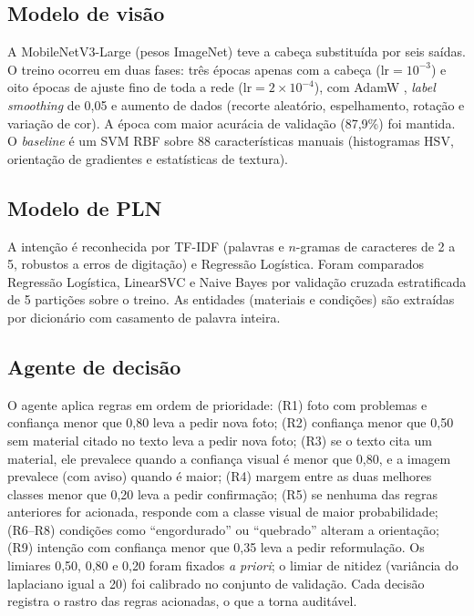 \documentclass[conference]{IEEEtran}
\begin{document}
\subsection{Modelo de vis\~ao}
A MobileNetV3-Large (pesos ImageNet) teve a cabe\c{c}a substitu\'ida por seis sa\'idas. O treino ocorreu em duas fases: tr\^es \'epocas apenas com a cabe\c{c}a ($\text{lr}=10^{-3}$) e oito \'epocas de ajuste fino de toda a rede ($\text{lr}=2\times10^{-4}$), com AdamW \cite{loshchilov2019adamw}, \emph{label smoothing} de 0,05 e aumento de dados (recorte aleat\'orio, espelhamento, rota\c{c}\~ao e varia\c{c}\~ao de cor). A \'epoca com maior acur\'acia de valida\c{c}\~ao (87,9\%) foi mantida. O \emph{baseline} \'e um SVM RBF sobre 88 caracter\'isticas manuais (histogramas HSV, orienta\c{c}\~ao de gradientes e estat\'isticas de textura).

\subsection{Modelo de PLN}
A inten\c{c}\~ao \'e reconhecida por TF-IDF (palavras e $n$-gramas de caracteres de 2 a 5, robustos a erros de digita\c{c}\~ao) e Regress\~ao Log\'istica. Foram comparados Regress\~ao Log\'istica, LinearSVC e Naive Bayes por valida\c{c}\~ao cruzada estratificada de 5 parti\c{c}\~oes sobre o treino. As entidades (materiais e condi\c{c}\~oes) s\~ao extra\'idas por dicion\'ario com casamento de palavra inteira.

\subsection{Agente de decis\~ao}
O agente aplica regras em ordem de prioridade: (R1) foto com problemas e confian\c{c}a menor que 0,80 leva a pedir nova foto; (R2) confian\c{c}a menor que 0,50 sem material citado no texto leva a pedir nova foto; (R3) se o texto cita um material, ele prevalece quando a confian\c{c}a visual \'e menor que 0,80, e a imagem prevalece (com aviso) quando \'e maior; (R4) margem entre as duas melhores classes menor que 0,20 leva a pedir confirma\c{c}\~ao; (R5) se nenhuma das regras anteriores for acionada, responde com a classe visual de maior probabilidade; (R6--R8) condi\c{c}\~oes como ``engordurado'' ou ``quebrado'' alteram a orienta\c{c}\~ao; (R9) inten\c{c}\~ao com confian\c{c}a menor que 0,35 leva a pedir reformula\c{c}\~ao. Os limiares 0,50, 0,80 e 0,20 foram fixados \emph{a priori}; o limiar de nitidez (vari\^ancia do laplaciano igual a 20) foi calibrado no conjunto de valida\c{c}\~ao. Cada decis\~ao registra o rastro das regras acionadas, o que a torna audit\'avel.
\end{document}

